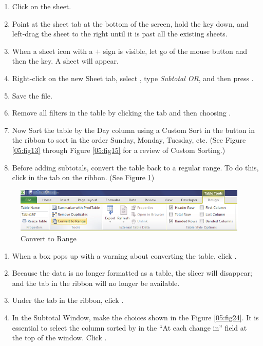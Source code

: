 \begin{enumerate}
	\item Click on the  sheet.
	\item Point at the  sheet tab at the bottom of the screen, hold the  key down, and left-drag the sheet to the right until it is past all the existing sheets.
	\item When a sheet icon with a $ + $ sign is visible, let go of the mouse button and then the  key. A  sheet will appear.
	\item Right-click on the new Sheet tab, select , type \textit{Subtotal OR}, and then press .
	\item Save the file.
	\item Remove all filters in the table by clicking the  tab and then choosing .
	\item Now Sort the table by the Day column using a Custom Sort in the  button in the ribbon to sort in the order Sunday, Monday, Tuesday, etc. (See Figure \ref{05:fig13} through Figure \ref{05:fig15} for a review of Custom Sorting.)
	\item Before adding subtotals, convert the table back to a regular range. To do this, click  in the  tab on the ribbon. (See Figure \ref{05:fig23})
\end{enumerate}

\begin{figure}[H]
	\centering
	\includegraphics[width=\maxwidth{.95\linewidth}]{gfx/ch05_fig23}
	\caption{Convert to Range}
	\label{05:fig23}
\end{figure}

\begin{enumerate}[resume]
	\item When a box pops up with a warning about converting the table, click .
	\item Because the data is no longer formatted as a table, the slicer will disappear; and the  tab in the ribbon will no longer be available.
	\item Under the  tab in the ribbon, click .
	\item In the Subtotal Window, make the choices shown in the Figure \ref{05:fig24}. It is essential to select the column sorted by in the ``At each change in'' field at the top of the window. Click .
\end{enumerate}

